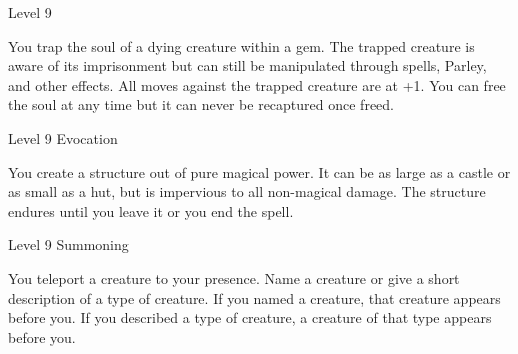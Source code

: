        
\startSpellName
          	Level 9
\stopSpellName
       

You trap the soul of a dying creature within a gem. The trapped creature is aware of its imprisonment but can still be manipulated through spells, Parley, and other effects. All moves against the trapped creature are at +1. You can free the soul at any time but it can never be recaptured once freed.

       
\startSpellName
          	Level 9	Evocation
\stopSpellName
       

You create a structure out of pure magical power. It can be as large as a castle or as small as a hut, but is impervious to all non-magical damage. The structure endures until you leave it or you end the spell.

       
\startSpellName
          	Level 9	Summoning
\stopSpellName
       

You teleport a creature to your presence. Name a creature or give a short description of a type of creature. If you named a creature, that creature appears before you. If you described a type of creature, a creature of that type appears before you.

     

           
